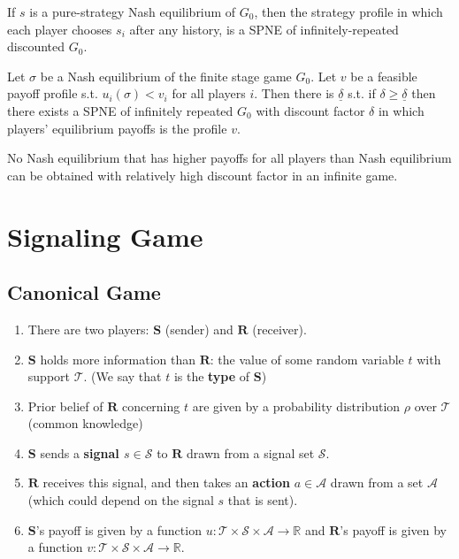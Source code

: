 \documentclass[11pt]{elegantbook}
\begin{document}
\begin{corollary}
    If $s$ is a pure-strategy Nash equilibrium of $G_0$, then the strategy profile in which each player chooses $s_i$ after any history, is a SPNE of infinitely-repeated discounted $G_0$.
\end{corollary}

\begin{proposition}
    Let $\sigma$ be a Nash equilibrium of the finite stage game $G_0$. Let $v$ be a feasible payoff profile s.t. $u_i(\sigma) < v_i$ for all players $i$. Then there is $\underline{\delta}$ s.t. if $\delta\geq \underline{\delta}$ then there exists a SPNE of infinitely repeated $G_0$ with discount factor $\delta$ in which players' equilibrium payoffs is the profile $v$.
\end{proposition}
No Nash equilibrium that has higher payoffs for all players than Nash equilibrium can be obtained with relatively high discount factor in an infinite game.






\section{Signaling Game}
\subsection{Canonical Game}
\begin{definition}
    \normalfont
    \begin{enumerate}
        \item There are two players: $\mathbf{S}$ (sender) and $\mathbf{R}$ (receiver).
        \item $\mathbf{S}$ holds more information than $\mathbf{R}$: the value of some random variable $t$ with support $\mathcal{T}$. (We say that $t$ is the \textbf{type} of $\mathbf{S}$)
        \item Prior belief of $\mathbf{R}$ concerning $t$ are given by a probability distribution $\rho$ over $\mathcal{T}$ (common knowledge)
        \item $\mathbf{S}$ sends a \textbf{signal $s\in \mathcal{S}$} to $\mathbf{R}$ drawn from a signal set $\mathcal{S}$.
        \item $\mathbf{R}$ receives this signal, and then takes an \textbf{action} $a\in \mathcal{A}$ drawn from a set $\mathcal{A}$ (which could depend on the signal $s$ that is sent).
        \item $\mathbf{S}$'s payoff is given by a function $u: \mathcal{T}\times \mathcal{S} \times \mathcal{A} \rightarrow \mathbb{R}$ and $\mathbf{R}$'s payoff is given by a function $v: \mathcal{T}\times \mathcal{S} \times \mathcal{A} \rightarrow \mathbb{R}$.
    \end{enumerate}
\end{definition}
\end{document}

